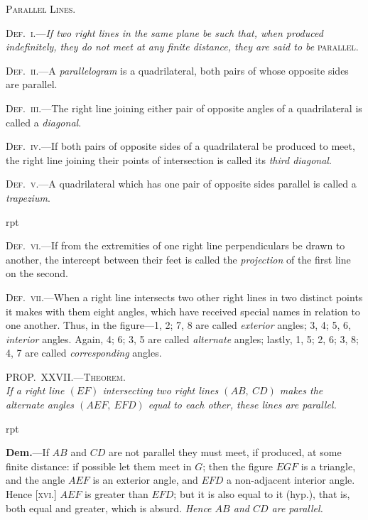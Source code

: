 \documentclass[oneside]{book}
\newcounter{wrapwidth}
\newcommand\myprop[2]{
\bigskip\Needspace*{4\baselineskip}\begin{center}\textsc{#1}\\\medskip\emph{#2}\par\end{center}
}
\newcommand\imgflow[3]{
\setcounter{wrapwidth}{#1}

\begin{wrapfigure}[#2]{r}{\value{wrapwidth}pt}
\begin{center}
\vspace{-0.3in}

\end{center}
\end{wrapfigure}
}
\begin{document}
\begin{center}
\textsc{Parallel Lines.}
\end{center}

\textsc{Def.~i.}---\textit{If two right lines in the same plane be such
that, when produced indefinitely, they do not meet at any
finite distance, they are said to be} \textsc{parallel}.

\textsc{Def.~ii.}---A \emph{parallelogram} is a quadrilateral, both
pairs of whose opposite sides are parallel.



\textsc{Def.~iii}.---The right line joining either pair of opposite
angles of a quadrilateral is called a \emph{diagonal}.

\textsc{Def.~iv}.---If both pairs of opposite sides of a quadrilateral
be produced to meet, the right line joining their
points of intersection is called its \emph{third diagonal}.

\textsc{Def.~v}.---A quadrilateral which has one pair of opposite
sides parallel is called a \emph{trapezium}.


\imgflow{110}{8}{f046}

\textsc{Def.~vi}.---If from the extremities of one right line
perpendiculars be drawn to another, the intercept between
their feet is called the \emph{projection} of the first line
on the second.


\textsc{Def.~vii}\label{def8}.---When a right line
intersects two other right lines
in two distinct points it makes
with them eight angles, which
have received special names in
relation to one another. Thus,
in the figure---1, 2; 7, 8 are
called \emph{exterior} angles; 3, 4; 5, 6, \emph{interior} angles.
Again, 4; 6; 3, 5 are called \emph{alternate} angles; lastly,
1, 5; 2, 6; 3, 8; 4, 7 are called \emph{corresponding} angles.

\myprop{PROP\@.~XXVII\@.---Theorem.}{If a right line $(EF)$ intersecting two right lines $(AB,\
CD)$ makes the alternate angles $(AEF,\ EFD)$ equal to
each other, these lines are parallel.}


\imgflow{160}{7}{f047}

\textbf{Dem.}---If $AB$ and $CD$ are not parallel they must meet,
if produced, at some finite
distance: if possible let
them meet in $G$; then
the figure $EGF$ is a triangle,
and the angle $AEF$
is an exterior angle, and
$EFD$ a non-adjacent interior
angle. Hence [\textsc{xvi.}] $AEF$ is greater than $EFD$;
but it is also equal to it (hyp.), that is, both equal and
greater, which is absurd. \emph{Hence $AB$ and $CD$ are
parallel.}\par\medskip
\end{document}
